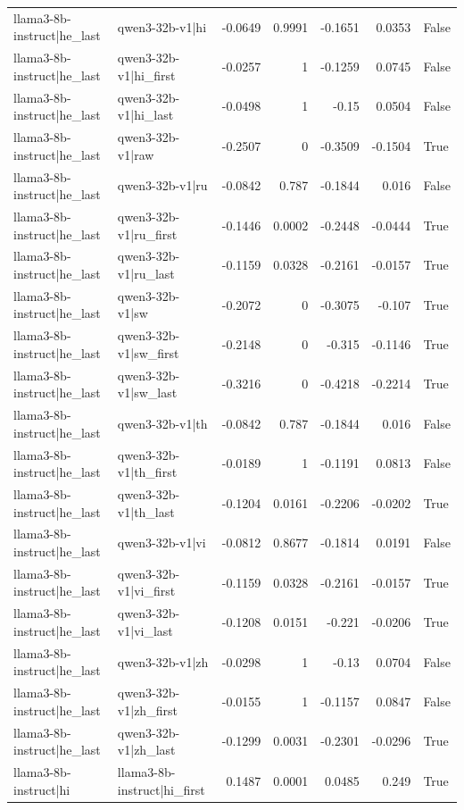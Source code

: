 \begin{table}
\begin{tabular}{l l r r r r l}
llama3-8b-instruct|he_last & qwen3-32b-v1|hi & -0.0649 & 0.9991 & -0.1651 & 0.0353 & False \\
llama3-8b-instruct|he_last & qwen3-32b-v1|hi_first & -0.0257 & 1 & -0.1259 & 0.0745 & False \\
llama3-8b-instruct|he_last & qwen3-32b-v1|hi_last & -0.0498 & 1 & -0.15 & 0.0504 & False \\
llama3-8b-instruct|he_last & qwen3-32b-v1|raw & -0.2507 & 0 & -0.3509 & -0.1504 & True \\
llama3-8b-instruct|he_last & qwen3-32b-v1|ru & -0.0842 & 0.787 & -0.1844 & 0.016 & False \\
llama3-8b-instruct|he_last & qwen3-32b-v1|ru_first & -0.1446 & 0.0002 & -0.2448 & -0.0444 & True \\
llama3-8b-instruct|he_last & qwen3-32b-v1|ru_last & -0.1159 & 0.0328 & -0.2161 & -0.0157 & True \\
llama3-8b-instruct|he_last & qwen3-32b-v1|sw & -0.2072 & 0 & -0.3075 & -0.107 & True \\
llama3-8b-instruct|he_last & qwen3-32b-v1|sw_first & -0.2148 & 0 & -0.315 & -0.1146 & True \\
llama3-8b-instruct|he_last & qwen3-32b-v1|sw_last & -0.3216 & 0 & -0.4218 & -0.2214 & True \\
llama3-8b-instruct|he_last & qwen3-32b-v1|th & -0.0842 & 0.787 & -0.1844 & 0.016 & False \\
llama3-8b-instruct|he_last & qwen3-32b-v1|th_first & -0.0189 & 1 & -0.1191 & 0.0813 & False \\
llama3-8b-instruct|he_last & qwen3-32b-v1|th_last & -0.1204 & 0.0161 & -0.2206 & -0.0202 & True \\
llama3-8b-instruct|he_last & qwen3-32b-v1|vi & -0.0812 & 0.8677 & -0.1814 & 0.0191 & False \\
llama3-8b-instruct|he_last & qwen3-32b-v1|vi_first & -0.1159 & 0.0328 & -0.2161 & -0.0157 & True \\
llama3-8b-instruct|he_last & qwen3-32b-v1|vi_last & -0.1208 & 0.0151 & -0.221 & -0.0206 & True \\
llama3-8b-instruct|he_last & qwen3-32b-v1|zh & -0.0298 & 1 & -0.13 & 0.0704 & False \\
llama3-8b-instruct|he_last & qwen3-32b-v1|zh_first & -0.0155 & 1 & -0.1157 & 0.0847 & False \\
llama3-8b-instruct|he_last & qwen3-32b-v1|zh_last & -0.1299 & 0.0031 & -0.2301 & -0.0296 & True \\
llama3-8b-instruct|hi & llama3-8b-instruct|hi_first & 0.1487 & 0.0001 & 0.0485 & 0.249 & True \\

\end{tabular}
\end{table}
